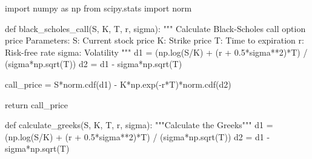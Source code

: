 \documentclass[
  letterpaper,
  DIV=11,
  numbers=noendperiod]{scrartcl}
\newenvironment{Shaded}{\begin{snugshade}}{\end{snugshade}}
\newcommand{\CommentTok}[1]{\textcolor[rgb]{0.37,0.37,0.37}{#1}}
\newcommand{\ControlFlowTok}[1]{\textcolor[rgb]{0.00,0.23,0.31}{#1}}
\newcommand{\DecValTok}[1]{\textcolor[rgb]{0.68,0.00,0.00}{#1}}
\newcommand{\FloatTok}[1]{\textcolor[rgb]{0.68,0.00,0.00}{#1}}
\newcommand{\ImportTok}[1]{\textcolor[rgb]{0.00,0.46,0.62}{#1}}
\newcommand{\KeywordTok}[1]{\textcolor[rgb]{0.00,0.23,0.31}{#1}}
\newcommand{\NormalTok}[1]{\textcolor[rgb]{0.00,0.23,0.31}{#1}}
\newcommand{\OperatorTok}[1]{\textcolor[rgb]{0.37,0.37,0.37}{#1}}
\begin{document}
\begin{tcolorbox}[enhanced jigsaw, colback=white, rightrule=.15mm, coltitle=black, left=2mm, colframe=quarto-callout-note-color-frame, breakable, arc=.35mm, bottomtitle=1mm, toptitle=1mm, titlerule=0mm, leftrule=.75mm, colbacktitle=quarto-callout-note-color!10!white, title={Example 5.1 (Python Implementation)}, toprule=.15mm, opacitybacktitle=0.6, bottomrule=.15mm, opacityback=0]

\begin{Shaded}
\begin{Highlighting}[]
\ImportTok{import}\NormalTok{ numpy }\ImportTok{as}\NormalTok{ np}
\ImportTok{from}\NormalTok{ scipy.stats }\ImportTok{import}\NormalTok{ norm}

\KeywordTok{def}\NormalTok{ black\_scholes\_call(S, K, T, r, sigma):}
    \CommentTok{"""}
\CommentTok{    Calculate Black{-}Scholes call option price}
\CommentTok{    }
\CommentTok{    Parameters:}
\CommentTok{    S: Current stock price}
\CommentTok{    K: Strike price  }
\CommentTok{    T: Time to expiration}
\CommentTok{    r: Risk{-}free rate}
\CommentTok{    sigma: Volatility}
\CommentTok{    """}
\NormalTok{    d1 }\OperatorTok{=}\NormalTok{ (np.log(S}\OperatorTok{/}\NormalTok{K) }\OperatorTok{+}\NormalTok{ (r }\OperatorTok{+} \FloatTok{0.5}\OperatorTok{*}\NormalTok{sigma}\OperatorTok{**}\DecValTok{2}\NormalTok{)}\OperatorTok{*}\NormalTok{T) }\OperatorTok{/}\NormalTok{ (sigma}\OperatorTok{*}\NormalTok{np.sqrt(T))}
\NormalTok{    d2 }\OperatorTok{=}\NormalTok{ d1 }\OperatorTok{{-}}\NormalTok{ sigma}\OperatorTok{*}\NormalTok{np.sqrt(T)}
    
\NormalTok{    call\_price }\OperatorTok{=}\NormalTok{ S}\OperatorTok{*}\NormalTok{norm.cdf(d1) }\OperatorTok{{-}}\NormalTok{ K}\OperatorTok{*}\NormalTok{np.exp(}\OperatorTok{{-}}\NormalTok{r}\OperatorTok{*}\NormalTok{T)}\OperatorTok{*}\NormalTok{norm.cdf(d2)}
    
    \ControlFlowTok{return}\NormalTok{ call\_price}

\KeywordTok{def}\NormalTok{ calculate\_greeks(S, K, T, r, sigma):}
    \CommentTok{"""Calculate the Greeks"""}
\NormalTok{    d1 }\OperatorTok{=}\NormalTok{ (np.log(S}\OperatorTok{/}\NormalTok{K) }\OperatorTok{+}\NormalTok{ (r }\OperatorTok{+} \FloatTok{0.5}\OperatorTok{*}\NormalTok{sigma}\OperatorTok{**}\DecValTok{2}\NormalTok{)}\OperatorTok{*}\NormalTok{T) }\OperatorTok{/}\NormalTok{ (sigma}\OperatorTok{*}\NormalTok{np.sqrt(T))}
\NormalTok{    d2 }\OperatorTok{=}\NormalTok{ d1 }\OperatorTok{{-}}\NormalTok{ sigma}\OperatorTok{*}\NormalTok{np.sqrt(T)}
    

\end{Highlighting}
\end{Shaded}
\end{tcolorbox}
\end{document}
